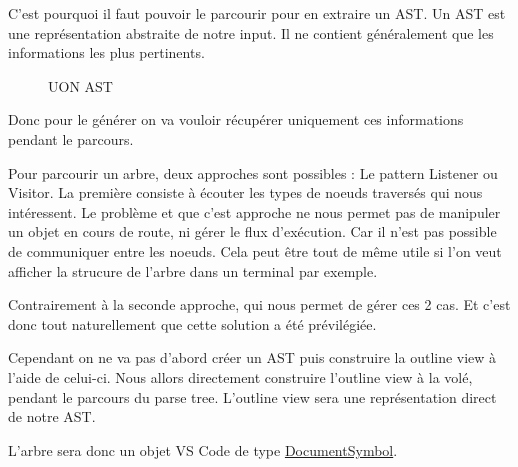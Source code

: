 \documentclass[
    iict, %
    il, %
]{heig-tb}
\begin{document}
C'est pourquoi il faut pouvoir le parcourir pour en extraire un AST.
Un AST est une représentation abstraite de notre input. Il ne contient généralement que les informations les plus pertinents.

\begin{figure}[!h]
    \begin{center}
    \end{center}
    \caption[UON AST]{\label{ast} UON AST}
\end{figure}

Donc pour le générer on va vouloir récupérer uniquement ces informations pendant le parcours.

Pour parcourir un arbre, deux approches sont possibles : Le pattern Listener ou Visitor.
La première consiste à écouter les types de noeuds traversés qui nous intéressent. Le problème et que c'est approche ne nous permet pas de manipuler un objet en cours de route, ni gérer le flux d'exécution.
Car il n'est pas possible de communiquer entre les noeuds. Cela peut être tout de même utile si l'on veut afficher la strucure de l'arbre dans un terminal par exemple.

Contrairement à la seconde approche, qui nous permet de gérer ces 2 cas. Et c'est donc tout naturellement que cette solution a été prévilégiée.

Cependant on ne va pas d'abord créer un AST puis construire la outline view à l'aide de celui-ci.
Nous allors directement construire l'outline view à la volé, pendant le parcours du parse tree. L'outline view sera une représentation direct de notre AST.

L'arbre sera donc un objet VS Code de type \href{https://code.visualstudio.com/api/references/vscode-api#DocumentSymbol}{DocumentSymbol}.
\end{document}
